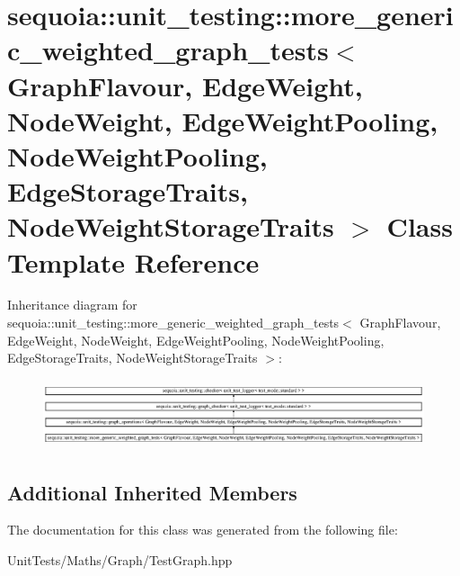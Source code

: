 \hypertarget{classsequoia_1_1unit__testing_1_1more__generic__weighted__graph__tests}{}\section{sequoia\+::unit\+\_\+testing\+::more\+\_\+generic\+\_\+weighted\+\_\+graph\+\_\+tests$<$ Graph\+Flavour, Edge\+Weight, Node\+Weight, Edge\+Weight\+Pooling, Node\+Weight\+Pooling, Edge\+Storage\+Traits, Node\+Weight\+Storage\+Traits $>$ Class Template Reference}
\label{classsequoia_1_1unit__testing_1_1more__generic__weighted__graph__tests}
Inheritance diagram for sequoia\+::unit\+\_\+testing\+::more\+\_\+generic\+\_\+weighted\+\_\+graph\+\_\+tests$<$ Graph\+Flavour, Edge\+Weight, Node\+Weight, Edge\+Weight\+Pooling, Node\+Weight\+Pooling, Edge\+Storage\+Traits, Node\+Weight\+Storage\+Traits $>$\+:\begin{figure}[H]
\begin{center}
\leavevmode
\includegraphics[height=2.030825cm]{classsequoia_1_1unit__testing_1_1more__generic__weighted__graph__tests}
\end{center}
\end{figure}
\subsection*{Additional Inherited Members}


The documentation for this class was generated from the following file\+:\begin{DoxyCompactItemize}
\item 
Unit\+Tests/\+Maths/\+Graph/Test\+Graph.\+hpp\end{DoxyCompactItemize}
